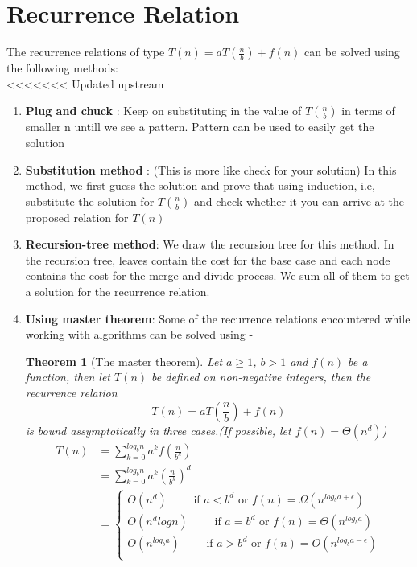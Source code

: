 \documentclass{article}
\newtheorem*{theorem}{Theorem}
\begin{document}
\section{Recurrence Relation}
	The recurrence relations of type $T(n) = aT(\frac{n}{b}) + f(n)$ can be solved using the following methods:\\
<<<<<<< Updated upstream
	\begin{enumerate}
		\item \textbf{Plug and chuck} : Keep on substituting in the value of $T(\frac{n}{b})$ in terms of smaller n untill we see a pattern. Pattern can be used to easily get the solution
		\item \textbf{Substitution method} : (This is more like check for your solution) In this method, we first guess the solution and prove that using induction, i.e, substitute the solution for $T(\frac{n}{b})$ and check whether it you can arrive at the proposed relation for $T(n)$
		\item \textbf{Recursion-tree method}: We draw the recursion tree for this method. In the recursion tree, leaves contain the cost for the base case and each node contains the cost for the merge and divide process. We sum all of them to get a solution for the recurrence relation. 
		\item \textbf{Using master theorem}: Some of the recurrence relations encountered while working with algorithms can be solved using -
		\begin{theorem}[The master theorem]
		Let $a\geq 1$, $b>1$ and $f(n)$ be a function, then let $T(n)$ be defined on non-negative integers, then the recurrence relation
		\[T(n) = aT(\frac{n}{b}) + f(n) \] is bound assymptotically in three cases.(If possible, let $f(n)= \Theta(n^d)$)
		\begin{align*}
			T(n) &= \sum_{k=0}^{log_bn} a^k f(\frac{n}{b^k})\\
				&= \sum_{k=0}^{log_bn} a^k (\frac{n}{b^k})^d\\ 
				&= 
			\begin{cases}
			O(n^d) \qquad\text{ if } a<b^d\text{ or }f(n)= \Omega(n^{log_ba+\epsilon})\\
			O(n^d logn) \qquad \text{ if } a=b^d\text{ or }f(n)= \Theta(n^{log_ba})\\
			O(n^{log_ba}) \qquad \text{ if } a>b^d\text{ or }f(n)= O(n^{log_ba-\epsilon})\\
			\end{cases}	
		\end{align*}
		\end{theorem}


\end{enumerate}
\end{document}
